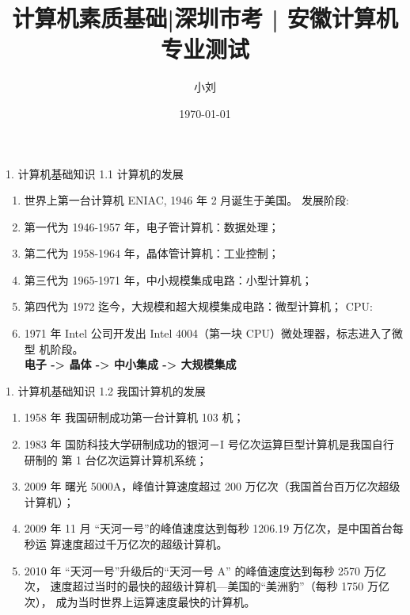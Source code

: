 \documentclass[aspectratio=169]{beamer}
\begin{document}
%
%

\title{计算机素质基础|深圳市考 | 安徽计算机专业测试}
\author{小刘}
\date{\today}

\begin{frame}
\titlepage
\end{frame}

\begin{frame}[t]{1. 计算机基础知识} \vspace{20pt}
    1.1 计算机的发展

    \begin{enumerate}
        \item{世界上第一台计算机 ENIAC, 1946 年 2 月诞生于美国。}
            发展阶段:
        \item{第一代为 1946-1957 年，电子管计算机：数据处理；}
        \item{第二代为 1958-1964 年，晶体管计算机：工业控制；}
        \item{第三代为 1965-1971 年，中小规模集成电路：小型计算机；}
        \item{第四代为 1972 迄今，大规模和超大规模集成电路：微型计算机；}
            CPU:
        \item{1971 年 Intel 公司开发出 Intel 4004（第一块 CPU）微处理器，标志进入了微型
机阶段。}\\
\textbf{电子 -> 晶体 -> 中小集成 -> 大规模集成}

    \end{enumerate}

\end{frame}


\begin{frame}[t]{1. 计算机基础知识} \vspace{20pt}
    1.2 我国计算机的发展

    \begin{enumerate}
        \item{1958 年 我国研制成功第一台计算机 103 机；}
        \item {1983 年 国防科技大学研制成功的银河－I 号亿次运算巨型计算机是我国自行研制的
第 1 台亿次运算计算机系统；
}
        \item {2009 年 曙光 5000A，峰值计算速度超过 200 万亿次（我国首台百万亿次超级计算机）；}
        \item {2009 年 11 月 “天河一号”的峰值速度达到每秒 1206.19 万亿次，是中国首台每秒运
算速度超过千万亿次的超级计算机。
}
        \item {2010 年 “天河一号”升级后的“天河一号 A” 的峰值速度达到每秒 2570 万亿次，
速度超过当时的最快的超级计算机—美国的“美洲豹”（每秒 1750 万亿次），
成为当时世界上运算速度最快的计算机。}
    \end{enumerate}

\end{frame}
\end{document}
